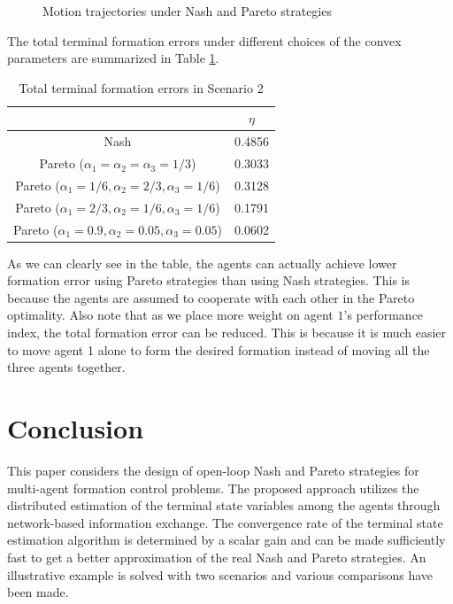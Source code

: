 \documentclass[12pt,draftcls,onecolumn]{IEEEtran}  %
\begin{document}
{\begin{figure}[h!]
      \caption{Motion trajectories under Nash and Pareto strategies}
      \label{NashPareto}
\end{figure}
The total terminal formation errors under different choices of the convex parameters are summarized in Table \ref{Scenario2Table}.
\begin{table}[h]\normalsize
\centering
\begin{tabular}{|c|c|}
  \hline
       & $\eta$  \\
       \hline
  Nash & 0.4856  \\
  \hline
  Pareto ($\alpha_1=\alpha_2=\alpha_3=1/3$)&0.3033\\
  \hline
  Pareto ($\alpha_1=1/6,\alpha_2=2/3,\alpha_3=1/6$)&0.3128\\
  \hline
  Pareto ($\alpha_1=2/3,\alpha_2=1/6,\alpha_3=1/6$)&0.1791\\
  \hline
  Pareto ($\alpha_1=0.9,\alpha_2=0.05,\alpha_3=0.05$)&0.0602\\
  \hline
\end{tabular}
\caption{Total terminal formation errors in Scenario 2}\label{Scenario2Table}
\end{table}
As we can clearly see in the table, the agents can actually achieve lower formation error using Pareto strategies than using Nash strategies. This is because the agents are assumed to cooperate with each other in the Pareto optimality. Also note that as we place more weight on agent $1$'s performance index, the total formation error can be reduced. This is because it is much easier to move agent 1 alone to form the desired formation {instead} of moving all the three agents together.

\section{Conclusion}\label{conclusion}
{This paper considers the design of open-loop Nash and Pareto strategies for multi-agent formation control problems. The proposed approach utilizes the distributed estimation of the terminal state variables among the agents through network-based information exchange. The convergence rate of the terminal state estimation algorithm is determined by a scalar gain and can be made sufficiently fast to get a better approximation of the real Nash and Pareto strategies. An illustrative example is solved with two scenarios and various comparisons have been made.}

}
\end{document}

